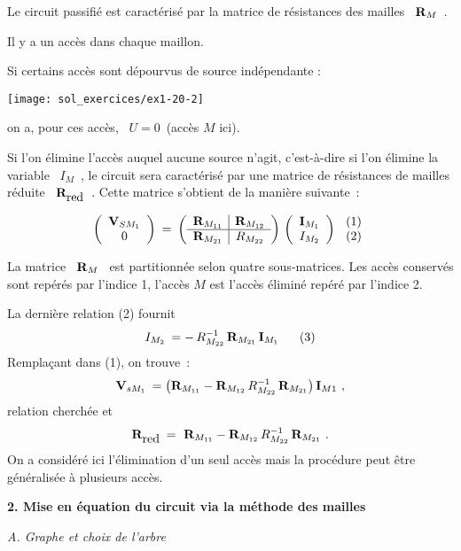 Le circuit passifié est caractérisé par la matrice de résistances des mailles \ ${\bf R}_M$~.

Il y a un accès dans chaque maillon.

Si certains accès sont dépourvus de source indépendante : 
\begin{center}
\texttt{[image: sol\_exercices/ex1-20-2]}
\end{center}
 on a, pour ces accès, \ $U = 0$~(accès $M$
 ici).

Si l'on élimine l'accès auquel aucune source n'agit, c'est-à-dire si
l'on élimine la variable \ $I_M$~, le circuit sera caractérisé par une
matrice de résistances de mailles réduite \ ${\bf
R}_{\mbox{red}}$~. Cette matrice s'obtient de la manière suivante~:

\[ \left( \begin{array}{c}
{\bf V}_{SM_1}\\ 0
\end{array} \right) \: = \: 
\left( \begin{array}{c|c}
{\bf R}_{M_{11}} & {\bf R}_{M_{12}}\\\hline
{\bf R}_{M_{21}} & R_{M_{22}}
\end{array} \right) \,
\left( \begin{array}{c}
{\bf I}_{M_1}\\
I_{M_2}
\end{array} \right) 
\: \begin{array}{c}
(1) \\ (2)
\end{array} \]

La matrice \ ${\bf R}_M$ \ est partitionnée selon quatre sous-matrices. Les
accès conservés sont repérés par l'indice 1, l'accès $M$ est l'accès
éliminé repéré par l'indice 2. 

La dernière relation (2) fournit
\[ I_{M_2} \: = -\, R_{M_{22}}^{-1} \, {\bf R}_{M_{21}} \, {\bf I}_{M_1}~~~~~(3) \]
Remplaçant dans (1), on trouve~:
\[ {\bf V}_{sM_1} \: = \left( {\bf R}_{M_{11}} - {\bf R}_{M_{12}} \, 
R_{M_{22}}^{-1}\, {\bf R}_{M_{21}} \right) {\bf I}_{M1}~, \]
relation cherchée et
\[ {\bf R}_{\mbox{red}} \: = \ {\bf R}_{M_{11}} - {\bf R}_{M_{12}} \, 
R_{M_{22}}^{-1} \, {\bf R}_{M_{21}}~. \] 
On a considéré ici
l'élimination d'un seul accès mais la procédure peut être généralisée
à plusieurs accès.

{\bf 2. Mise en équation du circuit via la méthode des mailles}

{\em A.  Graphe et choix de l'arbre}

